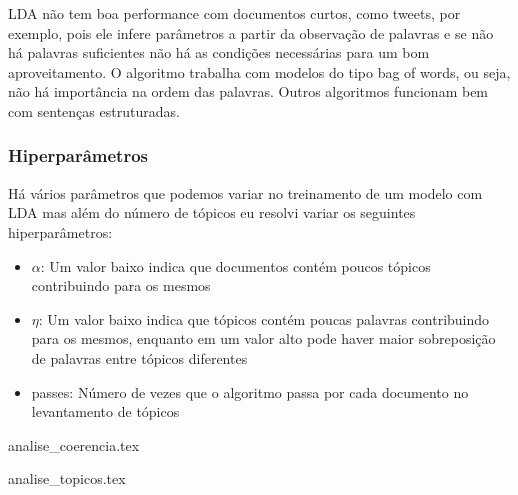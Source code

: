 LDA não tem boa performance com documentos curtos, como tweets, por exemplo, pois ele infere parâmetros a partir da observação de palavras e se não há palavras
suficientes não há as condições necessárias para um bom aproveitamento. O algoritmo trabalha com modelos do tipo bag of words, ou seja, 
não há importância na ordem das palavras. Outros algoritmos funcionam bem com sentenças estruturadas.

\subsubsection{Hiperparâmetros}

Há vários parâmetros que podemos variar no treinamento de um modelo com LDA mas além do número de tópicos eu resolvi variar os seguintes hiperparâmetros:

\begin{itemize}
    \item $\alpha$: Um valor baixo indica que documentos contém poucos tópicos contribuindo para os mesmos
    \item $\eta$: Um valor baixo indica que tópicos contém poucas palavras contribuindo para os mesmos, enquanto em um valor alto pode haver maior sobreposição 
    de palavras entre tópicos diferentes
    \item passes: Número de vezes que o algoritmo passa por cada documento no levantamento de tópicos
\end{itemize}

{analise_coerencia.tex}

{analise_topicos.tex}